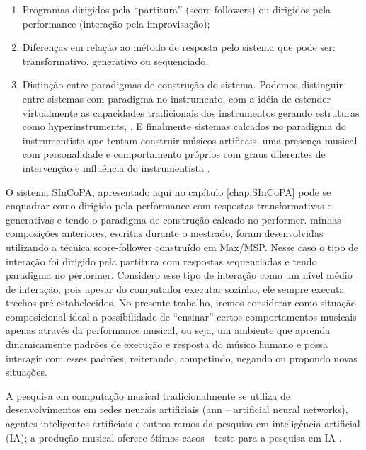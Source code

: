 \documentclass{ppgmus}
\begin{document}
\begin{enumerate}
\item Programas dirigidos pela ``partitura'' (score-followers) ou
  dirigidos pela performance (interação pela improvisação);
\item Diferenças em relação ao método de resposta pelo sistema que
  pode ser: transformativo, generativo ou sequenciado.
\item Distinção entre paradigmas de construção do sistema. Podemos
  distinguir entre sistemas com paradigma no instrumento, com a idéia
  de estender virtualmente as capacidades tradicionais dos
  instrumentos gerando estruturas como hyperinstruments, \cite{hyperinstrumento}. 
  E finalmente sistemas calcados no paradigma do
  instrumentista que tentam construir músicos artificais, uma presença
  musical com personalidade e comportamento próprios com graus
  diferentes de intervenção e influência do instrumentista \cite{rowe93:interactive}.
\end{enumerate}


O sistema SInCoPA, apresentado aqui no capítulo \ref{chap:SInCoPA} pode se enquadrar como dirigido pela
performance com respostas transformativas e generativas e tendo o
paradigma de construção calcado no performer. minhas composições
anteriores, escritas durante o mestrado, foram
desenvolvidas utilizando a técnica score-follower construído em
Max/MSP. Nesse caso o tipo de interação foi dirigido pela partitura
com respostas sequenciadas e tendo paradigma no performer.
Considero esse tipo de interação como um nível médio de interação,
pois apesar do computador executar sozinho, ele sempre executa trechos
pré-estabelecidos. No presente trabalho, iremos considerar como
situação composicional ideal a possibilidade de ``ensinar'' certos
comportamentos musicais apenas através da performance musical, ou
seja, um ambiente que aprenda dinamicamente padrões de execução e
resposta do músico humano e possa interagir com esses padrões,
reiterando, competindo, negando ou propondo novas situações.


A pesquisa em computação musical tradicionalmente se utiliza de
desenvolvimentos em redes neurais artificiais (ann – artificial neural
networks), agentes inteligentes artificiais e outros ramos da pesquisa
em inteligência artificial (IA); a produção musical oferece ótimos
casos - teste para a pesquisa em IA \cite{rowe2004machine}. 

\end{document}
